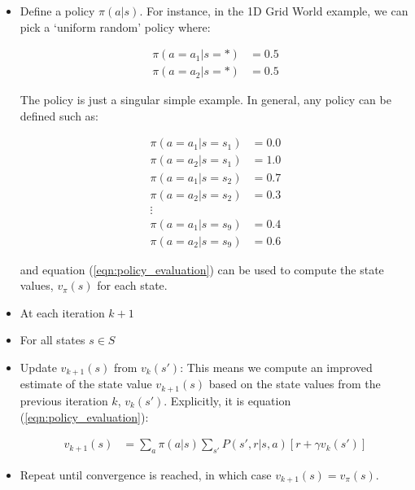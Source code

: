 \documentclass[a4paper,11pt]{article}
\begin{document}
\begin{itemize}
\item Define a policy $\pi(a|s)$.  For instance, in the 1D Grid World example, we can pick a `uniform random' policy where:

\begin{equation} \label{eqn:uniform_random_policy_for_1d_grid_world}
    \begin{split}
        \pi(a=a_1|s=\ast) &= 0.5 \\
        \pi(a=a_2|s=\ast) &= 0.5
    \end{split}
\end{equation}

The policy is just a singular simple example.  In general, any policy can be defined such as:

\begin{equation} \label{eqn:specific_weird_policy_for_1d_grid_world}
    \begin{split}
        \pi(a=a_1|s=s_1) &= 0.0 \\
        \pi(a=a_2|s=s_1) &= 1.0 \\
        \pi(a=a_1|s=s_2) &= 0.7 \\
        \pi(a=a_2|s=s_2) &= 0.3 \\
        \vdots \\
        \pi(a=a_1|s=s_{9}) &= 0.4 \\
        \pi(a=a_2|s=s_{9}) &= 0.6
    \end{split}
\end{equation}

and equation (\ref{eqn:policy_evaluation}) can be used to compute the state values, $v_\pi(s)$ for each state.

\item At each iteration $k+1$
\item For all states $s \in S$
\item Update $v_{k+1}(s)$ from $v_{k}(s')$: This means we compute an improved estimate of the state value $v_{k+1}(s)$ based on the state values from the previous iteration $k$, $v_{k}(s')$.  Explicitly, it is equation (\ref{eqn:policy_evaluation}):

\begin{equation} \label{eqn:policy_evaluation_iteration_eqn}
    \begin{split}
        v_{k+1} (s) &= \sum_{a} \pi(a|s) \sum_{s'} P(s',r|s,a) [r + \gamma v_{k}(s')]
    \end{split}
\end{equation}

\item Repeat until convergence is reached, in which case $v_{k+1}(s) = v_\pi(s)$.
\end{itemize}
\end{document}
